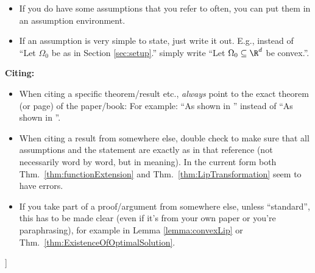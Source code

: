 {\begin{itemize}
    redundant. A few examples:
    \begin{itemize}
    \item ``convex and simply connected'' is redundant
    \item Convexity of $\Omega_1$ is assumed throughout, but
      does not seem to be used.
    \item Theorem \ref{th:minimalenergy} assumes $T\in
      C^k$. This property does not seem to be used in the
      proof.
  \end{itemize}      
\item If you do have some assumptions that you refer to often, you can
  put them in an assumption environment.
  \item If an assumption is very simple to state, just write it out.
    E.g., instead of ``Let $\Omega_0$ be as in Section
    \ref{sec:setup}.'' simply write ``Let
    $\Omega_0\subseteq\R^d$ be convex.''.
\end{itemize}


{\bf Citing:}
\begin{itemize}
\item When citing a specific theorem/result etc., \emph{always} point
  to the exact theorem (or page) of the paper/book: For example: ``As
  shown in \cite[Theorem 1]{measure-transport}'' instead of ``As shown
  in \cite{measure-transport}''.
  \item When citing a result from somewhere else, double check to make
    sure that all assumptions and the statement are exactly as in that
    reference (not necessarily word by word, but in meaning). In the
    current form both Thm.~\ref{thm:functionExtension} and
    Thm.~\ref{thm:LipTransformation} seem to have errors.
  \item If you take part of a proof/argument from somewhere else,
    unless ``standard'', this has to be made clear (even if it's
    from your own paper or you're paraphrasing), for example in Lemma
    \ref{lemma:convexLip} or
    Thm.~\ref{thm:ExistenceOfOptimalSolution}.
  \end{itemize}
  ]
  }

